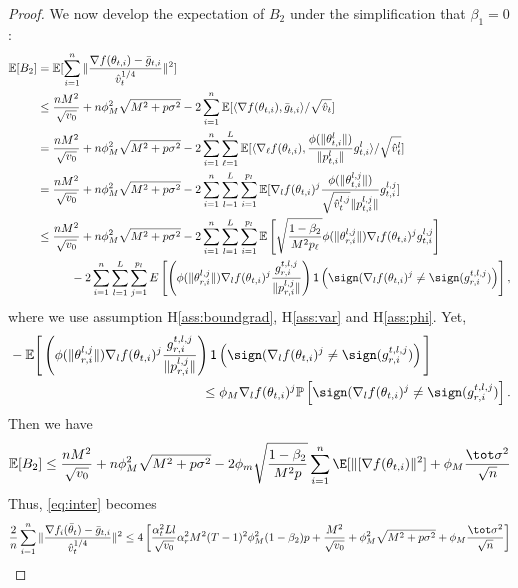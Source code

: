 \documentclass[manuscript,screen,review]{acmart}
\begin{document}
\begin{proof}


We now develop the expectation of $B_2$ under the simplification that $\beta_1 = 0$:
\begin{align}\notag
    \mathbb E[B_2]&=\mathbb E[\sum_{i=1}^n\Vert \frac{\nabla f(\theta_{t,i})-\bar g_{t,i}}{\hat v_t^{1/4}} \Vert^2] \\\notag
    &\leq \frac{nM^2}{\sqrt{v_0}}+n\phi_M^2\sqrt{M^2+p\sigma^2}-2\sum_{i=1}^n\mathbb E[\langle \nabla f(\theta_{t,i}),\bar g_{t,i} \rangle/\sqrt{\hat v_t}]\\\notag
    &=\frac{nM^2}{\sqrt{v_0}}+n\phi_M^2\sqrt{M^2+p\sigma^2}-2\sum_{i=1}^n \sum_{\ell=1}^L \mathbb E[\langle \nabla_\ell f(\theta_{t,i}),\frac{\phi(\|\theta_{t,i}^l \|)}{\| p_{t,i}^l \|}g_{t,i}^l \rangle/\sqrt{\hat v_t^l}]\\\notag
    &=\frac{nM^2}{\sqrt{v_0}}+n\phi_M^2\sqrt{M^2+p\sigma^2}-2\sum_{i=1}^n \sum_{l=1}^L\sum_{i=1}^{p_l} \mathbb E[\nabla_l f(\theta_{t,i})^j\frac{\phi(\|\theta_{t,i}^{l,j} \|)}{\sqrt{\hat v_t^{l,j}}\| p_{t,i}^{l,j} \|}g_{t,i}^{l,j} ]\\\notag
    & \leq \frac{nM^2}{\sqrt{v_0}}+n\phi_M^2\sqrt{M^2+p\sigma^2}-2\sum_{i=1}^n \sum_{l=1}^L\sum_{i=1}^{p_l} \mathbb E \left[ \sqrt{\frac{1-\beta_2}{M^2 p_\ell}}  \phi(\|\theta_{r,i}^{l,j}\|)  \nabla_l f(\theta_{t,i})^j  g_{t,i}^{l,j}\right]\\\notag
    &\hspace{0.4in} -2 \sum_{i = 1}^n \sum_{l=1}^L\sum_{j=1}^{p_l}  E \left[  \left( \phi(\|\theta_{r,i}^{l,j}\|)   \nabla_l f(\theta_{t,i})^j   \frac{g_{r,i}^{t,l,j}}{ \|p_{r,i}^{l,j}\|}\right)\mathsf{1}\left( \sign(  \nabla_l f(\theta_{t,i})^j \neq  \sign( g_{r,i}^{t,l,j}) \right)\right],
\end{align}
where we use assumption H\ref{ass:boundgrad}, H\ref{ass:var} and H\ref{ass:phi}. 
Yet,
\begin{align*}
&- \mathbb E \Bigg[  \left( \phi(\|\theta_{r,i}^{l,j}\|)   \nabla_l f(\theta_{t,i})^j   \frac{g_{r,i}^{t,l,j}}{ \|p_{r,i}^{l,j}\|}\right)\mathsf{1}\left( \sign(  \nabla_l f(\theta_{t,i})^j
\neq  \sign( g_{r,i}^{t,l,j}) \right)\Bigg] \\
&\hspace{2in} \leq  \phi_M \nabla_l f(\theta_{t,i})^j   \mathbb{P}\left[  \sign(  \nabla_l f(\theta_{t,i})^j \neq  \sign( g_{r,i}^{t,l,j}) \right].
\end{align*}
Then we have
\begin{align}\notag
    \mathbb E[B_2]\leq  \frac{nM^2}{\sqrt{v_0}}+n\phi_M^2\sqrt{M^2+p\sigma^2}-2 \phi_m \sqrt{\frac{1-\beta_2}{M^2 p}} \sum_{i=1}^n \E[\| [\nabla f(\theta_{t,i}) \|^2] + \phi_M \frac{\tot \sigma^2}{\sqrt{n}}
\end{align}
Thus, \eqref{eq:inter} becomes
\begin{align}\notag
    \frac{2}{n}\sum_{i=1}^n\Vert \frac{\nabla f_i(\bar\theta_t)-\bar g_{t,i}}{\hat v_t^{1/4}} \Vert^2 \leq 4 \left[ \frac{\alpha_t^2 Ll}{\sqrt{v_0}} \alpha_r^2 M^2 (T-1)^2 \phi_M^2 (1-\beta_2)p + \frac{M^2}{\sqrt{v_0}}+\phi_M^2\sqrt{M^2+p\sigma^2} + \phi_M \frac{\tot \sigma^2}{\sqrt{n}}\right]
\end{align}


\end{proof}
\end{document}
